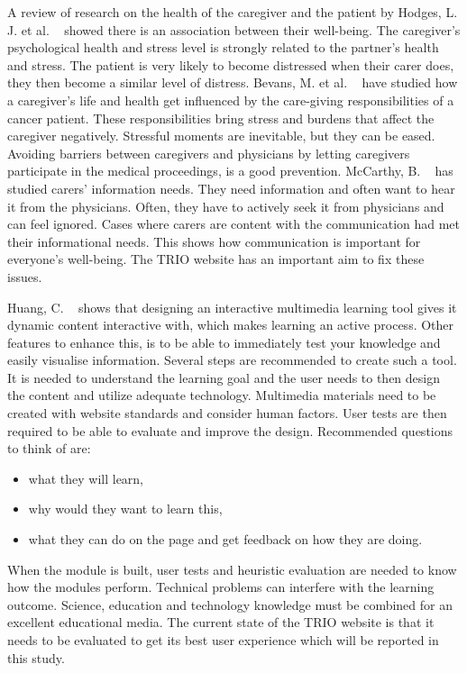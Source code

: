\documentclass{sigchi}
\begin{document}
A review of research on the health of the caregiver and the patient by Hodges, L. J. et al. ~\cite{Hodges2005} showed there is an association between their well-being. The caregiver’s psychological health and stress level is strongly related to the partner’s health and stress. The patient is very likely to become distressed when their carer does, they then become a similar level of distress. Bevans, M. et al. ~\cite{Bevans2012} have studied how a caregiver’s life and health get influenced by the care-giving responsibilities of a cancer patient. These responsibilities bring stress and burdens that affect the caregiver negatively. Stressful moments are inevitable, but they can be eased. Avoiding barriers between caregivers and physicians by letting caregivers participate in the medical proceedings, is a good prevention. McCarthy, B. ~\cite{McCarthy2011} has studied carers’ information needs. They need information and often want to hear it from the physicians. Often, they have to actively seek it from physicians and can feel ignored. Cases where carers are content with the communication had met their informational needs. This shows how communication is important for everyone’s well-being. The TRIO website has an important aim to fix these issues.  

Huang, C. ~\cite{Huang2005} shows that designing an interactive multimedia learning tool gives it dynamic content interactive with, which makes learning an active process. Other features to enhance this, is to be able to immediately test your knowledge and easily visualise information. Several steps are recommended to create such a tool. It is needed to understand the learning goal and the user needs to then design the content and utilize adequate technology. Multimedia materials need to be created with website standards and consider human factors. User tests are then required to be able to evaluate and improve the design. Recommended questions to think of are:

\begin{itemize}
    \item what they will learn, 
    \item why would they want to learn this, 
    \item what they can do on the page and get feedback on how they are doing. 
\end{itemize}

When the module is built, user tests and heuristic evaluation are needed to know how the modules perform. Technical problems can interfere with the learning outcome. Science, education and technology knowledge must be combined for an excellent educational media. The current state of the TRIO website is that it needs to be evaluated to get its best user experience which will be reported in this study. 
\end{document}
